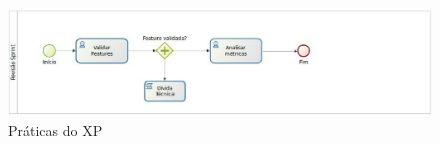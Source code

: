 \begin{figure}[ht]
	\centering
	\includegraphics[keepaspectratio=true,scale=0.9, width=\textwidth]{figuras/fig10.eps}
	\caption{Práticas do XP \cite{Beck:2004}}
	\label{fig10}
\end{figure}
